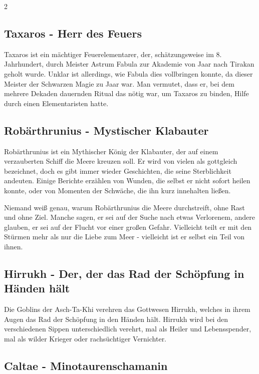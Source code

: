 \begin{multicols}{2}
{\subsection{Taxaros - Herr des Feuers}\label{subsec:taxaros-herr-des-feuers}

 Taxaros ist ein mächtiger Feuerelementarer, der, schätzungsweise im 8. Jahrhundert, durch Meister Astrum Fabula zur Akademie von Jaar nach Tirakan geholt wurde.
 Unklar ist allerdings, wie Fabula dies vollbringen konnte, da dieser Meister der Schwarzen Magie zu Jaar war.
 Man vermutet, dass er, bei dem mehrere Dekaden dauernden Ritual das nötig war, um Taxaros zu binden, Hilfe durch einen Elementaristen hatte.

\subsection{Robärthrunius - Mystischer Klabauter}\label{subsec:robarthrunius-mystischer-klabauter}

Robärthrunius ist ein Mythischer König der Klabauter, der auf einem verzauberten Schiff die Meere kreuzen soll.
Er wird von vielen als gottgleich bezeichnet, doch es gibt immer wieder Geschichten, die seine Sterblichkeit andeuten.
Einige Berichte erzählen von Wunden, die selbst er nicht sofort heilen konnte, oder von Momenten der Schwäche, die ihn kurz innehalten ließen.

Niemand weiß genau, warum Robärthrunius die Meere durchstreift, ohne Rast und ohne Ziel.
Manche sagen, er sei auf der Suche nach etwas Verlorenem, andere glauben, er sei auf der Flucht vor einer großen Gefahr.
Vielleicht teilt er mit den Stürmen mehr als nur die Liebe zum Meer - vielleicht ist er selbst ein Teil von ihnen.

\subsection{Hirrukh - Der, der das Rad der Schöpfung in Händen hält}\label{subsec:hirrukh-der-der-das-rad-der-schopfung-in-handen-halt}

Die Goblins der Asch-Ta-Khi verehren das Gottwesen Hirrukh, welches in ihrem Augen das Rad der Schöpfung in den Händen hält.
Hirrukh wird bei den verschiedenen Sippen unterschiedlich verehrt, mal als Heiler und Lebensspender, mal als wilder Krieger oder rachsüchtiger Vernichter.

\subsection{Caltae - Minotaurenschamanin}\label{subsec:caltae-minotaurenschamanin}

}
\end{multicols}
